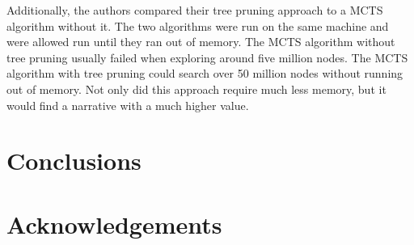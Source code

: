\documentclass{sig-alternate}
\begin{document}
Additionally, the authors compared their tree pruning approach to a MCTS algorithm without it. The two algorithms were run on the same machine and were allowed run until they ran out of memory. The MCTS algorithm without tree pruning usually failed when exploring around five million nodes. The MCTS  algorithm with tree pruning could search over 50 million nodes without running out of memory. Not only did this approach require much less memory, but it would find a narrative with a much higher value.

\section{Conclusions}

\section{Acknowledgements}


  
\end{document}
